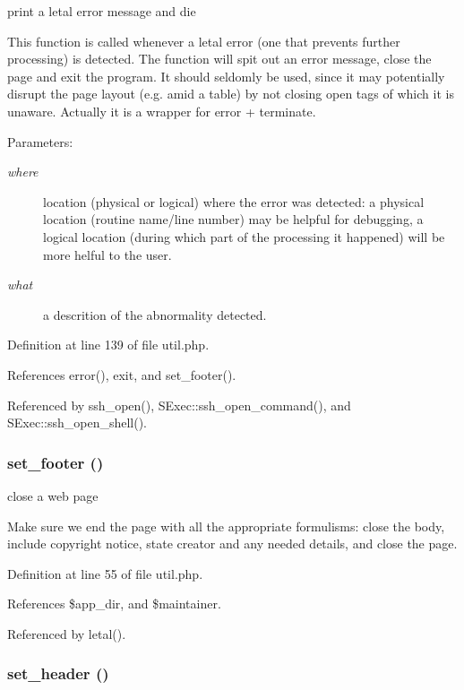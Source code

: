 print a letal error message and die 

This function is called whenever a letal error (one that prevents further processing) is detected. The function will spit out an error message, close the page and exit the program. It should seldomly be used, since it may potentially disrupt the page layout (e.g. amid a table) by not closing open tags of which it is unaware. Actually it is a wrapper for error + terminate.

\begin{Desc}
\item[Parameters:]
\begin{description}
\item[{\em where}]location (physical or logical) where the error was detected: a physical location (routine name/line number) may be helpful for debugging, a logical location (during which part of the processing it happened) will be more helful to the user.\item[{\em what}]a descrition of the abnormality detected. \end{description}
\end{Desc}


Definition at line 139 of file util.php.

References error(), exit, and set\_\-footer().

Referenced by ssh\_\-open(), SExec::ssh\_\-open\_\-command(), and SExec::ssh\_\-open\_\-shell().
\subsubsection{\setlength{\rightskip}{0pt plus 5cm}set\_\-footer ()}\label{util_8php_a1}


close a web page 

Make sure we end the page with all the appropriate formulisms: close the body, include copyright notice, state creator and any needed details, and close the page. 

Definition at line 55 of file util.php.

References \$app\_\-dir, and \$maintainer.

Referenced by letal().
\subsubsection{\setlength{\rightskip}{0pt plus 5cm}set\_\-header ()}\label{util_8php_a0}


